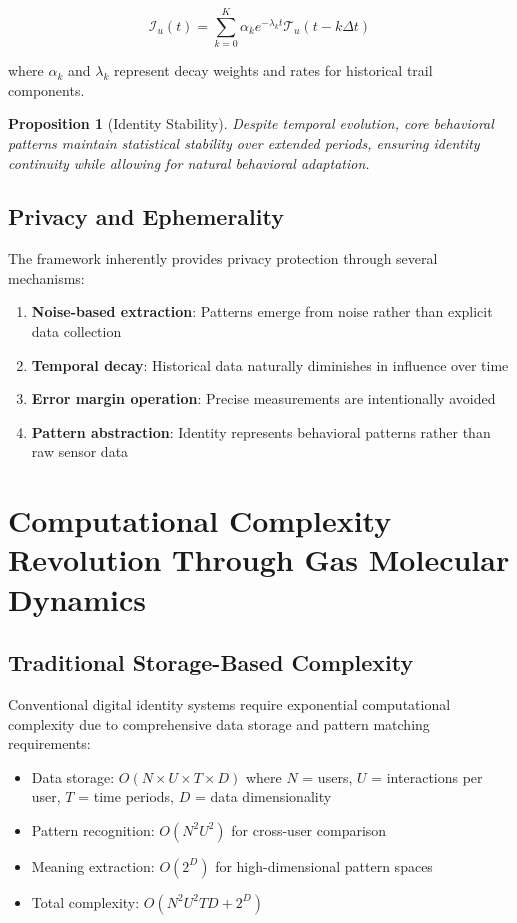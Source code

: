 \documentclass[12pt,a4paper]{article}
\newtheorem{proposition}{Proposition}
\begin{document}
$$\mathcal{I}_u(t) = \sum_{k=0}^{K} \alpha_k e^{-\lambda_k t} \mathcal{T}_u(t-k\Delta t)$$

where $\alpha_k$ and $\lambda_k$ represent decay weights and rates for historical trail components.

\begin{proposition}[Identity Stability]
Despite temporal evolution, core behavioral patterns maintain statistical stability over extended periods, ensuring identity continuity while allowing for natural behavioral adaptation.
\end{proposition}

\subsection{Privacy and Ephemerality}

The framework inherently provides privacy protection through several mechanisms:

\begin{enumerate}
\item \textbf{Noise-based extraction}: Patterns emerge from noise rather than explicit data collection
\item \textbf{Temporal decay}: Historical data naturally diminishes in influence over time
\item \textbf{Error margin operation}: Precise measurements are intentionally avoided
\item \textbf{Pattern abstraction}: Identity represents behavioral patterns rather than raw sensor data
\end{enumerate}

\section{Computational Complexity Revolution Through Gas Molecular Dynamics}

\subsection{Traditional Storage-Based Complexity}

Conventional digital identity systems require exponential computational complexity due to comprehensive data storage and pattern matching requirements:

\begin{itemize}
\item Data storage: $O(N \times U \times T \times D)$ where $N$ = users, $U$ = interactions per user, $T$ = time periods, $D$ = data dimensionality
\item Pattern recognition: $O(N^2 U^2)$ for cross-user comparison
\item Meaning extraction: $O(2^D)$ for high-dimensional pattern spaces
\item Total complexity: $O(N^2 U^2 T D + 2^D)$
\end{itemize}
\end{document}
